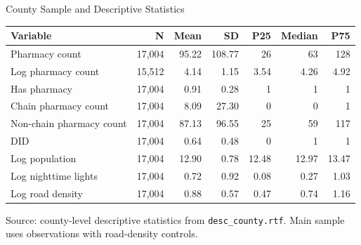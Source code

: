 \documentclass{beamer}
\begin{document}
\begin{frame}{County Sample and Descriptive Statistics}

\centering
\scriptsize
\setlength{\tabcolsep}{5pt}

\begin{tabular}{lrrrrrr}
\toprule
Variable & N & Mean & SD & P25 & Median & P75 \\
\midrule
Pharmacy count & 17,004 & 95.22 & 108.77 & 26 & 63 & 128 \\
Log pharmacy count & 15,512 & 4.14 & 1.15 & 3.54 & 4.26 & 4.92 \\
Has pharmacy & 17,004 & 0.91 & 0.28 & 1 & 1 & 1 \\
Chain pharmacy count & 17,004 & 8.09 & 27.30 & 0 & 0 & 1 \\
Non-chain pharmacy count & 17,004 & 87.13 & 96.55 & 25 & 59 & 117 \\
DID & 17,004 & 0.64 & 0.48 & 0 & 1 & 1 \\
Log population & 17,004 & 12.90 & 0.78 & 12.48 & 12.97 & 13.47 \\
Log nighttime lights & 17,004 & 0.72 & 0.92 & 0.08 & 0.27 & 1.03 \\
Log road density & 17,004 & 0.88 & 0.57 & 0.47 & 0.74 & 1.16 \\
\bottomrule
\end{tabular}

\vspace{0.5em}
\raggedright
\tiny Source: county-level descriptive statistics from \texttt{desc\_county.rtf}. Main sample uses observations with road-density controls.

\end{frame}
\end{document}
